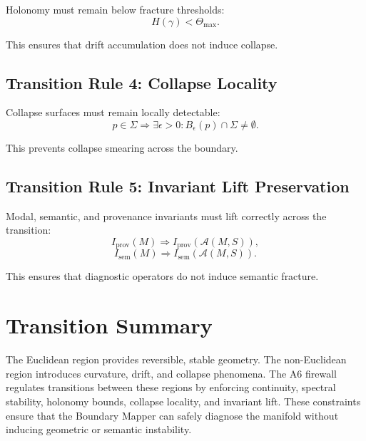 Holonomy must remain below fracture thresholds:
\[
H(\gamma) < \Theta_{\max}.
\]

This ensures that drift accumulation does not induce collapse.

\subsection{Transition Rule 4: Collapse Locality}

Collapse surfaces must remain locally detectable:
\[
p \in \Sigma \Rightarrow \exists \epsilon > 0 : B_\epsilon(p) \cap \Sigma \neq \emptyset.
\]

This prevents collapse smearing across the boundary.

\subsection{Transition Rule 5: Invariant Lift Preservation}

Modal, semantic, and provenance invariants must lift correctly across the
transition:
\[
I_{\mathrm{prov}}(M) \Rightarrow I_{\mathrm{prov}}(\mathcal{A}(M,S)),
\]
\[
I_{\mathrm{sem}}(M) \Rightarrow I_{\mathrm{sem}}(\mathcal{A}(M,S)).
\]

This ensures that diagnostic operators do not induce semantic fracture.

\section{Transition Summary}

The Euclidean region provides reversible, stable geometry. The non-Euclidean
region introduces curvature, drift, and collapse phenomena. The A6 firewall
regulates transitions between these regions by enforcing continuity, spectral
stability, holonomy bounds, collapse locality, and invariant lift. These
constraints ensure that the Boundary Mapper can safely diagnose the manifold
without inducing geometric or semantic instability.
